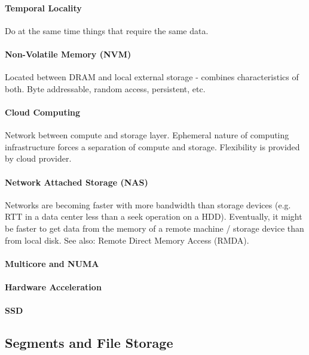 \paragraph{Temporal Locality}
Do at the same time things that require the same data.


\paragraph{Non-Volatile Memory (NVM)}
Located between DRAM and local external storage - combines characteristics of both. Byte addressable, random access, persistent, etc.

\paragraph{Cloud Computing}
Network between compute and storage layer. Ephemeral nature of computing infrastructure forces a separation of compute and storage. Flexibility is provided by cloud provider.

\paragraph{Network Attached Storage (NAS)}
Networks are becoming faster with more bandwidth than storage devices (e.g. RTT in a data center less than a seek operation on a HDD). Eventually, it might be faster to get data from the memory of a remote machine / storage device than from local disk. See also: Remote Direct Memory Access (RMDA).

\paragraph{Multicore and NUMA}


\paragraph{Hardware Acceleration}

\paragraph{SSD}



\subsection{Segments and File Storage}

